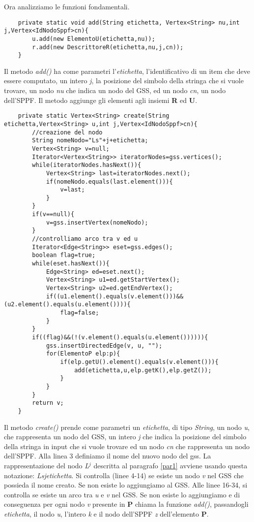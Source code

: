 Ora analizziamo le funzioni fondamentali.
\begin{lstlisting}
	private static void add(String etichetta, Vertex<String> nu,int j,Vertex<IdNodoSppf>cn){
		u.add(new ElementoU(etichetta,nu));
		r.add(new DescrittoreR(etichetta,nu,j,cn));
	}
\end{lstlisting}
Il metodo \textit{add()} ha come parametri l'\textit{etichetta}, l'identificativo di un item che deve essere computato, un intero \textit{j}, la posizione del simbolo della stringa che si vuole trovare, un nodo \textit{nu} che indica un nodo del GSS, ed un nodo \textit{cn}, un nodo dell'SPPF. Il metodo aggiunge gli elementi agli insiemi \textbf{R} ed \textbf{U}.
\begin{lstlisting}
	private static Vertex<String> create(String etichetta,Vertex<String> u,int j,Vertex<IdNodoSppf>cn){
		//creazione del nodo
		String nomeNodo="Ls"+j+etichetta;
		Vertex<String> v=null;
		Iterator<Vertex<String>> iteratorNodes=gss.vertices();
		while(iteratorNodes.hasNext()){
			Vertex<String> last=iteratorNodes.next();
			if(nomeNodo.equals(last.element())){
				v=last;
			}
		}
		if(v==null){
			v=gss.insertVertex(nomeNodo);
		}
		//controlliamo arco tra v ed u
		Iterator<Edge<String>> eset=gss.edges();
		boolean flag=true;
		while(eset.hasNext()){
			Edge<String> ed=eset.next();
			Vertex<String> u1=ed.getStartVertex();
			Vertex<String> u2=ed.getEndVertex();
			if((u1.element().equals(v.element()))&&(u2.element().equals(u.element()))){
				flag=false;
			}
		}
		if((flag)&&(!(v.element().equals(u.element()))))){
			gss.insertDirectedEdge(v, u, "");
			for(ElementoP elp:p){
				if(elp.getU().element().equals(v.element())){
					add(etichetta,u,elp.getK(),elp.getZ());
				}
			}
		}
		return v;
	}
\end{lstlisting}
Il metodo \textit{create()} prende come parametri un \textit{etichetta}, di tipo \textit{String}, un nodo \textit{u}, che rappresenta un nodo del GSS, un intero \textit{j} che indica la posizione del simbolo della stringa in input che si vuole trovare ed un nodo \textit{cn} che rappresenta un nodo dell'SPPF. Alla linea 3 definiamo il nome del nuovo nodo del gss. La rappresentazione del nodo \textit{L}$^{j}$ descritta al paragrafo \ref{par1} avviene usando questa notazione: \textit{Ls}\textit{j}\textit{etichetta}. Si controlla (linee 4-14) se esiste un nodo \textit{v} nel GSS che possieda il nome creato. Se non esiste lo aggiungiamo al GSS. Alle linee 16-34, si controlla se esiste un arco tra \textit{u} e \textit{v} nel GSS. Se non esiste lo aggiungiamo e di conseguenza per ogni nodo \textit{v} presente in \textbf{P} chiama la funzione \textit{add()}, passandogli \textit{etichetta}, il nodo \textit{u}, l'intero \textit{k} e il nodo dell'SPPF \textit{z} dell'elemento \textbf{P}.
